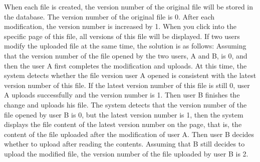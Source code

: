 



\vspace{0.3cm}
\noindent When each file is created, the version number of the original file will be stored in the database. The version number of the original file is 0. After each modification, the version number is increased by 1. When you click into the specific page of this file, all versions of this file will be displayed. If two users modify the uploaded file at the same time, the solution is as follows: Assuming that the version number of the file opened by the two users, A and B, is 0, and then the user A first completes the modification and uploads. At this time, the system detects whether the file version user A opened is consistent with the latest version number of this file. If the latest version number of this file is still 0, user A uploads successfully and the version number is 1. Then user B finishes the change and uploads his file. The system detects that the version number of the file opened by user B is 0, but the latest version number is 1, then the system displays the file content of the latest version number on the page, that is, the content of  the file uploaded after the modification of user A. Then user B decides whether to upload after reading the contents. Assuming that B still decides to upload the modified file, the version number of the file uploaded by user B is 2.

